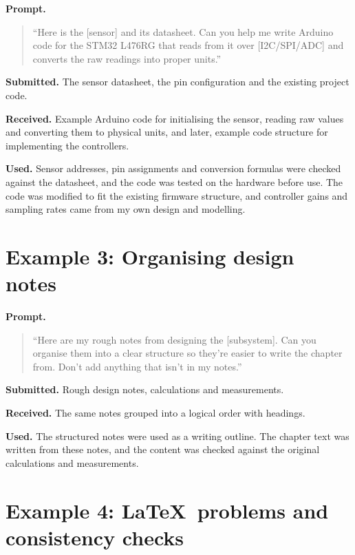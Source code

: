 \textbf{Prompt.}
\begin{quote}\small
``Here is the [sensor] and its datasheet. Can you help me write Arduino code for the STM32 L476RG that reads from it over [I2C/SPI/ADC] and converts the raw readings into proper units.''
\end{quote}


\textbf{Submitted.} The sensor datasheet, the pin configuration and the existing project code.

\textbf{Received.} Example Arduino code for initialising the sensor, reading raw values and converting them to physical units, and later, example code structure for implementing the controllers.

\textbf{Used.} Sensor addresses, pin assignments and conversion formulas were checked against the datasheet, and the code was tested on the hardware before use. The code was modified to fit the existing firmware structure, and controller gains and sampling rates came from my own design and modelling.

\section{Example 3: Organising design notes}
\label{app:ai-ex3}

\textbf{Prompt.}
\begin{quote}\small
``Here are my rough notes from designing the [subsystem]. Can you organise them into a clear structure so they're easier to write the chapter from. Don't add anything that isn't in my notes.''
\end{quote}

\textbf{Submitted.} Rough design notes, calculations and measurements.

\textbf{Received.} The same notes grouped into a logical order with headings.

\textbf{Used.} The structured notes were used as a writing outline. The chapter text was written from these notes, and the content was checked against the original calculations and measurements.

\section{Example 4: \LaTeX\ problems and consistency checks}
\label{app:ai-ex4}

